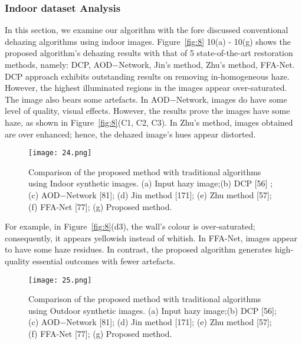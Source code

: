 \documentclass[doctor,english,listoffigures,listoftables]{thesis-uestc}
\begin{document}
\subsubsection{Indoor dataset Analysis}
In this section, we examine our algorithm with the fore discussed conventional dehazing algorithms using indoor images. Figure~\ref{fig:8} 10(a) - 10(g) shows the proposed algorithm's dehazing results with that of 5 state-of-the-art restoration methods, namely: DCP, AOD$-$Network, Jin's method, Zhu's method, FFA-Net. DCP approach exhibits outstanding results on removing in-homogeneous haze. However, the highest illuminated regions in the images appear over-saturated. The image also bears some artefacts. In AOD$-$Network, images do have some level of quality, visual effects. However, the results prove the images have some haze, as shown in Figure~\ref{fig:8}(C1, C2, C3). In Zhu's method, images obtained are over enhanced; hence, the dehazed image's hues appear distorted. 
\begin{figure}[!htb]
	\centering
	\texttt{[image: 24.png]}
	\caption{Comparison of the proposed method with traditional algorithms using Indoor synthetic images. (a) Input hazy image;(b) DCP [56] ; (c) AOD−Network [81]; (d) Jin method [171]; (e) Zhu method [57]; (f) FFA-Net [77]; (g) Proposed method.}
	\label{fig:9}
\end{figure}

For example, in Figure~\ref{fig:8}(d3), the wall's colour is over-saturated; consequently, it appears yellowish instead of whitish. In FFA-Net, images appear to have some haze residues. In contrast, the proposed algorithm generates high-quality essential outcomes with fewer artefacts. 
\begin{figure*}[!htb]
	\centering
	\texttt{[image: 25.png]}
	\caption{ Comparison of the proposed method with traditional algorithms using Outdoor synthetic images. (a) Input hazy image;(b) DCP [56]; (c) AOD−Network [81]; (d) Jin method [171]; (e) Zhu method [57]; (f) FFA-Net [77]; (g) Proposed method.}
	\label{fig:10}
\end{figure*}
\end{document}
